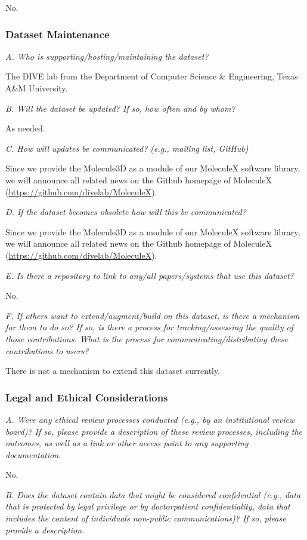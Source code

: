 \documentclass{article}
\begin{document}
No.

\subsubsection{Dataset Maintenance}

\textit{A. Who is supporting/hosting/maintaining the dataset?}

The DIVE lab from the Department of Computer Science \& Engineering, Texas A\&M University.

\textit{B. Will the dataset be updated? If so, how often and by whom?}

As needed.

\textit{C. How will updates be communicated? (e.g., mailing list, GitHub)}

Since we provide the Molecule3D as a module of our MoleculeX software library, we will announce all related news on the Github homepage of MoleculeX (\url{https://github.com/divelab/MoleculeX}).

\textit{D. If the dataset becomes obsolete how will this be communicated?}

Since we provide the Molecule3D as a module of our MoleculeX software library, we will announce all related news on the Github homepage of MoleculeX (\url{https://github.com/divelab/MoleculeX}). 

\textit{E. Is there a repository to link to any/all papers/systems that use this dataset?}

No.

\textit{F. If others want to extend/augment/build on this dataset, is there a mechanism for them to do so? If so, is there a process for tracking/assessing the quality of those contributions. What is the process for communicating/distributing these contributions to users?}

There is not a mechanism to extend this dataset currently.

\subsubsection{Legal and Ethical Considerations}

\textit{A. Were any ethical review processes conducted (e.g., by an institutional review board)? If so, please provide a description of these review processes, including the outcomes, as well as a link or other access point to any supporting documentation.}

No.

\textit{B. Does the dataset contain data that might be considered confidential (e.g., data that is protected by legal privilege or by doctorpatient confidentiality, data that includes the content of individuals non-public communications)? If so, please provide a description.}
\end{document}
